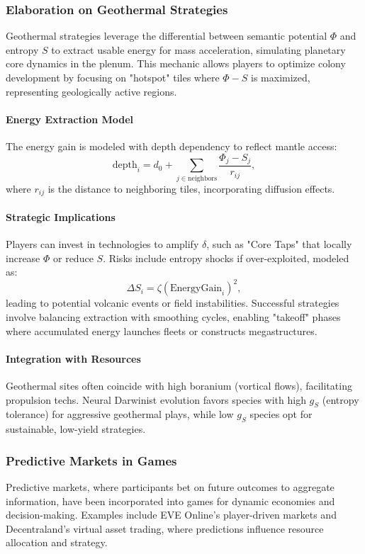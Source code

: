 \documentclass[12pt]{article}
\theoremstyle{definition}
\begin{document}
\subsubsection{Elaboration on Geothermal Strategies}
Geothermal strategies leverage the differential between semantic potential $\Phi$ and entropy $S$ to extract usable energy for mass acceleration, simulating planetary core dynamics in the plenum. This mechanic allows players to optimize colony development by focusing on "hotspot" tiles where $\Phi - S$ is maximized, representing geologically active regions.

\paragraph{Energy Extraction Model}
The energy gain is modeled with depth dependency to reflect mantle access:
\[
\text{depth}_i = d_0 + \sum_{j \in \text{neighbors}} \frac{\Phi_j - S_j}{r_{ij}},
\]
where $r_{ij}$ is the distance to neighboring tiles, incorporating diffusion effects.

\paragraph{Strategic Implications}
Players can invest in technologies to amplify $\delta$, such as "Core Taps" that locally increase $\Phi$ or reduce $S$. Risks include entropy shocks if over-exploited, modeled as:
\[
\Delta S_i = \zeta (\text{EnergyGain}_i)^2,
\]
leading to potential volcanic events or field instabilities. Successful strategies involve balancing extraction with smoothing cycles, enabling "takeoff" phases where accumulated energy launches fleets or constructs megastructures.

\paragraph{Integration with Resources}
Geothermal sites often coincide with high boranium (vortical flows), facilitating propulsion techs. Neural Darwinist evolution favors species with high $g_S$ (entropy tolerance) for aggressive geothermal plays, while low $g_S$ species opt for sustainable, low-yield strategies.

\subsubsection{Predictive Markets in Games}
Predictive markets, where participants bet on future outcomes to aggregate information, have been incorporated into games for dynamic economies and decision-making. Examples include EVE Online's player-driven markets and Decentraland's virtual asset trading, where predictions influence resource allocation and strategy.
\end{document}
